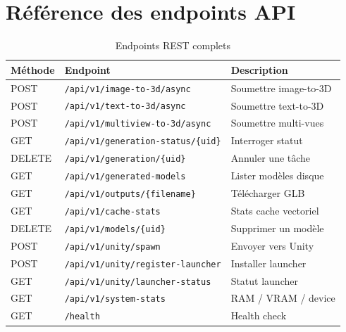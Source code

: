 \documentclass[12pt,a4paper,oneside]{report}
\begin{document}
\cleardoublepage
\printbibliography[heading=bibintoc, title={Bibliographie}]

\appendix

\chapter{Référence des endpoints API}
\label{ann:api}

\begin{table}[H]
\centering
\caption{Endpoints REST complets}
\begin{tabularx}{\linewidth}{@{}llX@{}}
\toprule
\textbf{Méthode} & \textbf{Endpoint} & \textbf{Description} \\\midrule
POST   & \texttt{/api/v1/image-to-3d/async}       & Soumettre image-to-3D \\
POST   & \texttt{/api/v1/text-to-3d/async}        & Soumettre text-to-3D \\
POST   & \texttt{/api/v1/multiview-to-3d/async}   & Soumettre multi-vues \\
GET    & \texttt{/api/v1/generation-status/\{uid\}}& Interroger statut \\
DELETE & \texttt{/api/v1/generation/\{uid\}}       & Annuler une tâche \\
GET    & \texttt{/api/v1/generated-models}         & Lister modèles disque \\
GET    & \texttt{/api/v1/outputs/\{filename\}}     & Télécharger GLB \\
GET    & \texttt{/api/v1/cache-stats}              & Stats cache vectoriel \\
DELETE & \texttt{/api/v1/models/\{uid\}}           & Supprimer un modèle \\
POST   & \texttt{/api/v1/unity/spawn}              & Envoyer vers Unity \\
POST   & \texttt{/api/v1/unity/register-launcher}  & Installer launcher \\
GET    & \texttt{/api/v1/unity/launcher-status}    & Statut launcher \\
GET    & \texttt{/api/v1/system-stats}             & RAM / VRAM / device \\
GET    & \texttt{/health}                          & Health check \\
\bottomrule
\end{tabularx}
\end{table}
\end{document}
